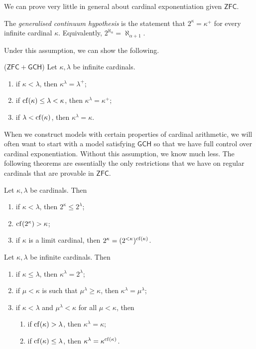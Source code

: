 We can prove very little in general about cardinal exponentiation given \( \mathsf{ZFC} \).
\begin{definition}
    The \emph{generalised continuum hypothesis} is the statement that \( 2^\kappa = \kappa^+ \) for every infinite cardinal \( \kappa \).
    Equivalently, \( 2^{\aleph_\alpha} = \aleph_{\alpha + 1} \).
\end{definition}
Under this assumption, we can show the following.
\begin{theorem}
    (\( \mathsf{ZFC} + \mathsf{GCH} \))
    Let \( \kappa, \lambda \) be infinite cardinals.
    \begin{enumerate}
        \item if \( \kappa < \lambda \), then \( \kappa^\lambda = \lambda^+ \);
        \item if \( \operatorname{cf}(\kappa) \leq \lambda < \kappa \), then \( \kappa^\lambda = \kappa^+ \);
        \item if \( \lambda < \operatorname{cf}(\kappa) \), then \( \kappa^\lambda = \kappa \).
    \end{enumerate}
\end{theorem}
When we construct models with certain properties of cardinal arithmetic, we will often want to start with a model satisfying \( \mathsf{GCH} \) so that we have full control over cardinal exponentiation.
Without this assumption, we know much less.
The following theorems are essentially the only restrictions that we have on regular cardinals that are provable in \( \mathsf{ZFC} \).
\begin{theorem}
    Let \( \kappa, \lambda \) be cardinals.
    Then
    \begin{enumerate}
        \item if \( \kappa < \lambda \), then \( 2^\kappa \leq 2^\lambda \);
        \item \( \operatorname{cf}(2^\kappa) > \kappa \);
        \item if \( \kappa \) is a limit cardinal, then \( 2^\kappa = (2^{<\kappa})^{\operatorname{cf}(\kappa)} \).
    \end{enumerate}
\end{theorem}
\begin{theorem}
    Let \( \kappa, \lambda \) be infinite cardinals.
    Then
    \begin{enumerate}
        \item if \( \kappa \leq \lambda \), then \( \kappa^\lambda = 2^\lambda \);
        \item if \( \mu < \kappa \) is such that \( \mu^\lambda \geq \kappa \), then \( \kappa^\lambda = \mu^\lambda \);
        \item if \( \kappa < \lambda \) and \( \mu^\lambda < \kappa \) for all \( \mu < \kappa \), then
        \begin{enumerate}
            \item if \( \operatorname{cf}(\kappa) > \lambda \), then \( \kappa^\lambda = \kappa \);
            \item if \( \operatorname{cf}(\kappa) \leq \lambda \), then \( \kappa^\lambda = \kappa^{\operatorname{cf}(\kappa)} \).
        \end{enumerate}
    \end{enumerate}
\end{theorem}
